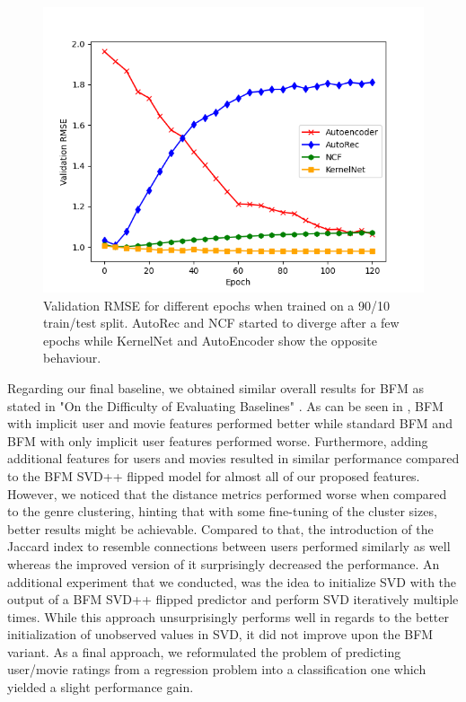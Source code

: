 \documentclass[10pt,conference,compsocconf]{IEEEtran}
\begin{document}
    \begin{figure}
        \includegraphics[width=\columnwidth]{figures/validation_plot.png}
        \caption{Validation RMSE for different epochs when trained on a 90/10 train/test split.
        AutoRec and NCF started to diverge after a few epochs while KernelNet and AutoEncoder show the opposite behaviour.}
        \label{fig:validation}
    \end{figure}

    Regarding our final baseline, we obtained similar overall results for BFM as stated in "On the Difficulty of Evaluating Baselines" \cite{rendle_difficulty_2019}.
    As can be seen in , BFM with implicit user and movie features performed better while standard BFM and BFM with only implicit user features performed worse.
    Furthermore, adding additional features for users and movies resulted in similar performance compared to the BFM SVD++ flipped model for almost all of our proposed features.
    However, we noticed that the distance metrics performed worse when compared to the genre clustering, hinting that with some fine-tuning of the cluster sizes, better results might be achievable.
    Compared to that, the introduction of the Jaccard index to resemble connections between users performed similarly as well whereas the improved version of it surprisingly decreased the performance.
    An additional experiment that we conducted, was the idea to initialize SVD with the output of a BFM SVD++ flipped predictor and perform SVD iteratively multiple times.
    While this approach unsurprisingly performs well in regards to the better initialization of unobserved values in SVD, it did not improve upon the BFM variant.
    As a final approach, we reformulated the problem of predicting user/movie ratings from a regression problem into a classification one which yielded a slight performance gain.
\end{document}
